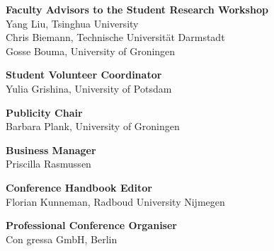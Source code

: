 {\bf Faculty Advisors to the Student Research Workshop} \\
Yang Liu, Tsinghua University \\
Chris Biemann, Technische Universität Darmstadt \\
Gosse Bouma, University of Groningen 

{\bf Student Volunteer Coordinator} \\
Yulia Grishina, University of Potsdam

{\bf Publicity Chair} \\
Barbara Plank, University of Groningen

{\bf Business Manager} \\
Priscilla Rasmussen

{\bf Conference Handbook Editor} \\
Florian Kunneman, Radboud University Nijmegen

{\bf Professional Conference Organiser} \\
Con gressa GmbH, Berlin
